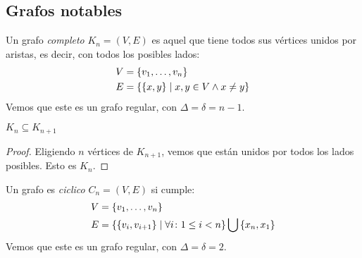 \subsection{Grafos notables}

\begin{definition}
  Un grafo \emph{completo} $K_n = (V,E)$ es aquel que tiene todos sus vértices
  unidos por aristas, es decir, con todos los posibles lados:
  \begin{align}
    V &= \left\{v_1,\mathellipsis, v_n\right\}\\
    E &= \left\{ \{x,y\} \mid x,y \in V \wedge x\neq y\right\} 
  \end{align}
  Vemos que este es un grafo regular, con $\Delta = \delta = n - 1$.
\end{definition}

\begin{proposition}
  $K_n \subseteq K_{n+1}$
\end{proposition}
\begin{proof}
  Eligiendo $n$ vértices de $K_{n+1}$, vemos que están unidos por todos los
  lados posibles. Esto es $K_n$.
\end{proof}

\begin{definition}
  Un grafo es \emph{ciclico} $C_n = (V,E)$ si cumple:
  \begin{align}
    V &= \left\{v_1,\mathellipsis,v_n\right\}\\
    E &= \left\{ \left\{v_i,v_{i+1}\right\} \mid
    \forall i \colon 1 \le i < n\right\} \bigcup \left\{x_n,x_1\right\}\\
  \end{align}
  Vemos que este es un grafo regular, con $\Delta = \delta = 2$.
\end{definition}

